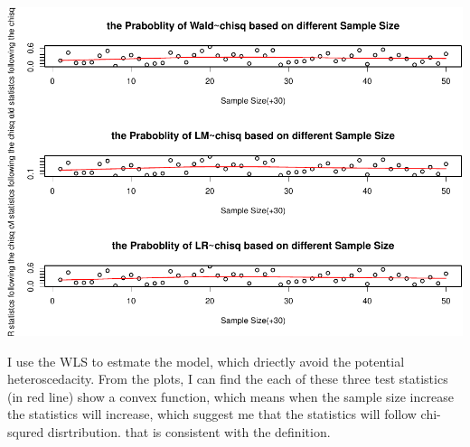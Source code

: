 \documentclass[]{article}
\begin{document}
\includegraphics{BST169Coursework_project_answer_files/figure-latex/unnamed-chunk-1-1.pdf}

I use the WLS to estmate the model, which driectly avoid the potential
heteroscedacity. From the plots, I can find the each of these three test
statistics (in red line) show a convex function, which means when the
sample size increase the statistics will increase, which suggest me that
the statistics will follow chi-squred disrtribution. that is consistent
with the definition.
\end{document}
